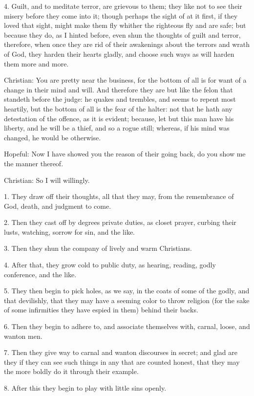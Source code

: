 4. Guilt, and to meditate terror, are grievous to them; they like not to see their misery before they come into it; though perhaps the sight of at it first, if they loved that sight, might make them fly whither the righteous fly and are safe; but because they do, as I hinted before, even shun the thoughts of guilt and terror, therefore, when once they are rid of their awakenings about the terrors and wrath of God, they harden their hearts gladly, and choose such ways as will harden them more and more.

Christian: You are pretty near the business, for the bottom of all is for want of a change in their mind and will. And therefore they are but like the felon that standeth before the judge: he quakes and trembles, and seems to repent most heartily, but the bottom of all is the fear of the halter: not that he hath any detestation of the offence, as it is evident; because, let but this man have his liberty, and he will be a thief, and so a rogue still; whereas, if his mind was changed, he would be otherwise.

Hopeful: Now I have showed you the reason of their going back, do you show me the manner thereof.

Christian: So I will willingly.

1. They draw off their thoughts, all that they may, from the remembrance of God, death, and judgment to come.

2. Then they cast off by degrees private duties, as closet prayer, curbing their lusts, watching, sorrow for sin, and the like.

3. Then they shun the company of lively and warm Christians.

4. After that, they grow cold to public duty, as hearing, reading, godly conference, and the like.

5. They then begin to pick holes, as we say, in the coats of some of the godly, and that devilishly, that they may have a seeming color to throw religion (for the sake of some infirmities they have espied in them) behind their backs.

6. Then they begin to adhere to, and associate themselves with, carnal, loose, and wanton men.

7. Then they give way to carnal and wanton discourses in secret; and glad are they if they can see such things in any that are counted honest, that they may the more boldly do it through their example.

8. After this they begin to play with little sins openly.

